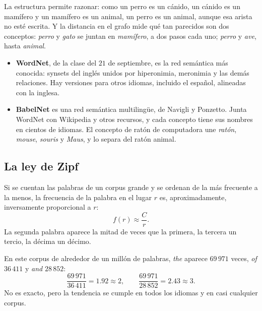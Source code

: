 \documentclass[11pt,letterpaper]{article}
\begin{document}
La estructura permite razonar: como un perro es un cánido, un cánido es
un mamífero y un mamífero es un animal, un perro es un animal, aunque
esa arista no esté escrita. Y la distancia en el grafo mide qué tan
parecidos son dos conceptos: \textit{perro} y \textit{gato} se juntan
en \textit{mamífero}, a dos pasos cada uno; \textit{perro} y
\textit{ave}, hasta \textit{animal}.

\begin{itemize}[itemsep=0.3em]
    \item \textbf{WordNet}, de la clase del $21$ de septiembre, es la red
          semántica más conocida: synsets del inglés unidos por
          hiperonimia, meronimia y las demás relaciones. Hay versiones
          para otros idiomas, incluido el español, alineadas con la
          inglesa.
    \item \textbf{BabelNet} es una red semántica multilingüe, de
          Navigli y Ponzetto. Junta WordNet con Wikipedia y otros
          recursos, y cada concepto tiene sus nombres en cientos de
          idiomas. El concepto de ratón de computadora une
          \textit{ratón}, \textit{mouse}, \textit{souris} y
          \textit{Maus}, y lo separa del ratón animal.
\end{itemize}


\subsection*{La ley de Zipf}

Si se cuentan las palabras de un corpus grande y se ordenan de la más
frecuente a la menos, la frecuencia de la palabra en el lugar $r$ es,
aproximadamente, inversamente proporcional a $r$:
\[
    f(r) \approx \frac{C}{r} .
\]
La segunda palabra aparece la mitad de veces que la primera, la tercera
un tercio, la décima un décimo.

\begin{ejemplo}
    En este corpus de alrededor de un millón de palabras,
    \textit{the} aparece $69\,971$ veces, \textit{of} $36\,411$ y
    \textit{and} $28\,852$:
    \[
        \frac{69\,971}{36\,411} = 1.92 \approx 2 ,
        \qquad
        \frac{69\,971}{28\,852} = 2.43 \approx 3 .
    \]
    No es exacto, pero la tendencia se cumple en todos los idiomas y
    en casi cualquier corpus.
\end{ejemplo}
\end{document}
